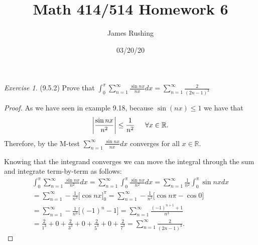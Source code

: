 \documentclass[12pt,oneside]{amsart}
\title{Math 414/514 Homework 6}
\author{James Rushing}
\date{03/20/20}
\theoremstyle{definition}
\theoremstyle{remark}
\newtheorem{exer}{Exercise}
\numberwithin{equation}{exer}
\newcommand{\itt}{\int_0^\pi}
\newcommand{\smm}{\sum_{n=1}^{\infty}}
\begin{document}
\maketitle

\begin{exer} (9.5.2)
Prove that $\int_0^\pi \sum_{n=1}^\infty \frac{\sin{nx}}{n x}dx 
= \sum_{n=1}^\infty \frac{2}{(2n-1)^3}$
\end{exer}


\begin{proof}

\indent As we have seen in example 9.18, because $\sin{(nx)} \leq 1$ we have that 
\begin{align*}
    \bigg|\frac{\sin{nx}}{n^2}\bigg| \leq \frac{1}{n^2} \indent \forall x \in \mathbb{R}.
\end{align*}
Therefore, by the M-test $ \sum_{n=1}^\infty \frac{\sin{nx}}{n x}dx $ converges for all $x \in \mathbb{R}$.

Knowing that the integrand converges we can move the integral through the sum and integrate term-by-term as follows:
\begin{align*}
        \itt \smm \frac{\sin{nx}}{n^2} dx = \smm \itt \frac{\sin nx}{n^2} dx 
        = \smm \frac{1}{n^2} \itt \sin{nx}dx \\
        =\smm -\frac{1}{n^3}\big[ \cos{nx}\big]_0^\pi =
        \smm - \frac{1}{n^3}\big[\cos{n \pi} - \cos{0} \big] \\
        = \smm -\frac{1}{n^3} \big[(-1)^n - 1\big] = \smm \frac{(-1)^{n+1} + 1}{n^3} \\
        = \frac{2}{1^3} + 0 + \frac{2}{3^3} + 0 +\frac{2}{5^3} +0 + \frac{2}{7^3} = \smm \frac{2}{(2n - 1)^3}.
\end{align*}
\end{proof}
\end{document}
